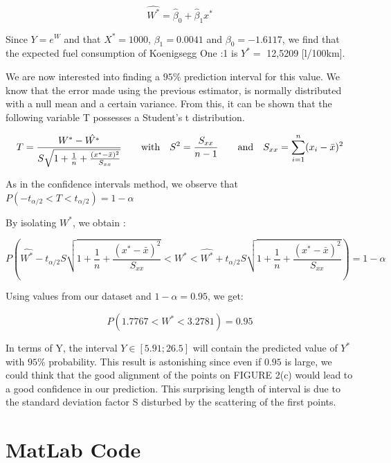 \documentclass[a4paper]{article}
\begin{document}
\begin{enumerate}[(a)]
$$\hat{W^*} = \hat{\beta}_0 + \hat{\beta}_1 x^*$$

Since $Y = e^{W}$ and that $X^*=1000$, $\beta_1=0.0041$ and $\beta_0=-1.6117$, we find that the expected fuel consumption of Koenigsegg One :1 is $Y^*=$ 12,5209 [l/100km].

We are now interested into finding a $95\%$ prediction interval for this value. We know that the error made using the previous estimator, is normally distributed with a null mean and a certain variance. From this, it can be shown that the following variable T possesses a Student's t distribution.

$$T = \frac{W^*-\hat{W^*}}{S\sqrt{1+\frac{1}{n}+\frac{(x^*-\bar{x})^2}{S_{xx}}}} \qquad \textup{with} \quad S^2= \frac{S_{xx}}{n-1} \qquad \textup{and} \quad S_{xx} = \sum_{i=1}^n (x_i-\bar{x})^2  $$

As in the confidence intervals method, we observe that $P(-t_{\alpha /2} < T < t_{\alpha /2}) = 1-\alpha$

By isolating $W^*$, we obtain :

$$P\left ( \hat{W^*}-t_{\alpha/2}S\sqrt{1+\frac{1}{n}+\frac{(x^*-\bar{x})^2}{S_{xx}}} < W^* < \hat{W^*}+t_{\alpha/2}S\sqrt{1+\frac{1}{n}+\frac{(x^*-\bar{x})^2}{S_{xx}}} \right ) = 1-\alpha$$

Using values from our dataset and $1-\alpha = 0.95$, we get:

$$P\left (1.7767 < W^* < 3.2781 \right ) = 0.95$$

In terms of Y, the interval $Y \in \left [ 5.91;26.5 \right ]$ will contain the predicted value of $Y^*$ with $95\%$ probability. This result is astonishing since even if $0.95$ is large, we could think that the good alignment of the points on FIGURE 2(c) would lead to a good confidence in our prediction. This surprising length  of interval is due to the standard deviation factor S disturbed by the scattering of the first points.


\end{enumerate}


\newpage

\appendix

\section{MatLab Code}
\end{document}
